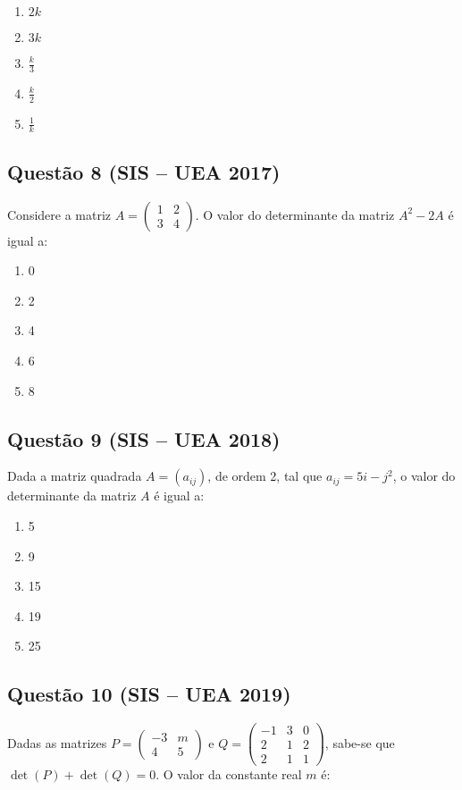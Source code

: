 \documentclass{article}
\begin{document}
\begin{multicols}{2}
		\begin{enumerate}[label=(\Alph*), noitemsep]
			\item \( 2k \)
			\item \( 3k \)
			\item \( \frac{k}{3} \)
			\item \( \frac{k}{2} \)
			\item \( \frac{1}{k} \)
		\end{enumerate}
		
		\subsection*{Questão 8 (SIS – UEA 2017)}
		Considere a matriz \( A = \begin{pmatrix} 1 & 2 \\ 3 & 4 \end{pmatrix} \). O valor do determinante da matriz \( A^2 - 2A \) é igual a:
		
		\begin{enumerate}[label=(\Alph*), noitemsep]
			\item 0
			\item 2
			\item 4
			\item 6
			\item 8
		\end{enumerate}
		
		\subsection*{Questão 9 (SIS – UEA 2018)}
		Dada a matriz quadrada \( A = (a_{ij}) \), de ordem 2, tal que  
		\( a_{ij} = 5i - j^2 \), o valor do determinante da matriz \( A \) é igual a:
		
		\begin{enumerate}[label=(\Alph*), noitemsep]
			\item 5
			\item 9
			\item 15
			\item 19
			\item 25
		\end{enumerate}
		
		\subsection*{Questão 10 (SIS – UEA 2019)}
		Dadas as matrizes \( P = \begin{pmatrix} -3 & m \\ 4 & 5 \end{pmatrix} \) e \( Q = \begin{pmatrix} -1 & 3 & 0 \\ 2 & 1 & 2 \\ 2 & 1 & 1 \end{pmatrix} \), sabe-se que \(\det(P) + \det(Q) = 0\). O valor da constante real \( m \) é:
		

\end{multicols}
\end{document}
